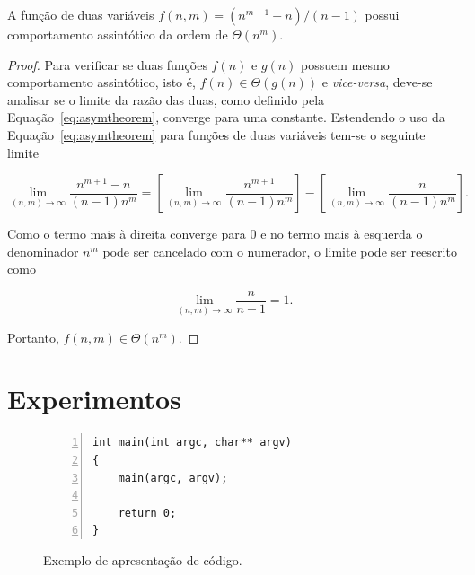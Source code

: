 \documentclass[11pt,a4paper]{article}
\begin{document}
\begin{lema}[Comportamento assintótico de $f(n,m)=(n^{m+1}-n)/(n-1)$]
\label{lem:comptns}
A função de duas variáveis $f(n,m)=(n^{m+1}-n)/(n-1)$ possui comportamento
assintótico da ordem de $\Theta(n^m)$.
\end{lema}

\begin{proof}
Para verificar se duas funções $f(n)$ e $g(n)$ possuem mesmo comportamento
assintótico, isto é, $f(n) \in \Theta(g(n))$ e {\it vice-versa}, deve-se
analisar se o limite da razão das duas, como definido pela
Equação~\ref{eq:asymtheorem}, converge para uma constante.
Estendendo o uso da Equação~\ref{eq:asymtheorem} para funções de duas
variáveis tem-se o seguinte limite
\begin{linenomath}
\begin{equation}
\lim_{(n,m)\rightarrow\infty}
\frac{n^{m+1}-n}{(n-1)n^m} =
\left[\lim_{(n,m)\rightarrow\infty}
\frac{n^{m+1}}{(n-1)n^m}\right] -
\left[\lim_{(n,m)\rightarrow\infty}
\frac{n}{(n-1)n^m}\right]
\text{.}
\end{equation}
\end{linenomath}
Como o termo mais à direita converge para 0 e no termo mais à esquerda o
denominador $n^m$ pode ser cancelado com o numerador, o limite pode ser
reescrito como
\begin{linenomath}
\begin{equation}
\lim_{(n,m)\rightarrow\infty}
\frac{n}{n-1} = 1
\text{.}
\end{equation}
\end{linenomath}
Portanto, $f(n,m) \in \Theta(n^m)$.
\end{proof}

\section{Experimentos}
\label{sec:3:experimentos}

\begin{figure}[ht]
\begin{minipage}{\textwidth}
\begin{Verbatim}[frame=single,xleftmargin=5mm,numbers=left,numbersep=3pt]
int main(int argc, char** argv)
{
    main(argc, argv);

    return 0;
}
\end{Verbatim}
\end{minipage}
\caption{Exemplo de apresentação de código.}
\end{figure}
\end{document}
